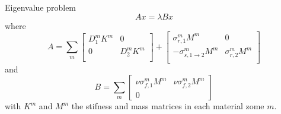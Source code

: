 \documentclass[12pt]{article}
\begin{document}
Eigenvalue problem
\[
A x = \lambda Bx
\]
where
\[
A = \sum_m 
\begin{bmatrix}
D_1^m K^m & 0\\
0 & D_2^m K^m \\
\end{bmatrix}
+
\begin{bmatrix}
\sigma_{r,1}^m M^m & 0\\
-\sigma_{s,1\to2}^m M^m & \sigma_{r,2}^m M^m \\
\end{bmatrix}
\]
and
\[
B = \sum_m 
\begin{bmatrix}
\nu\sigma_{f,1}^m M^m & \nu\sigma_{f,2}^m M^m \\
0 & 
\end{bmatrix}
\]
with $K^m$ and $M^m$ the stifness and mass matrices in each material zome $m$.
\end{document}
